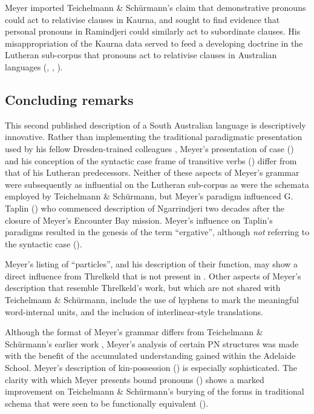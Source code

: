 Meyer imported Teichelmann \& Schürmann’s claim that demonstrative pronouns could act to relativise clauses in Kaurna, and sought to find evidence that personal pronouns in Ramindjeri could similarly act to subordinate clauses. His misappropriation of the Kaurna data served to feed a developing doctrine in the Lutheran sub-corpus that pronouns act to relativise clauses in Australian languages (, , ).

\subsection{Concluding remarks}
\label{sec:key:6.1.3}

This second published description of a South Australian language is descriptively innovative. Rather than implementing the traditional paradigmatic presentation used by his fellow Dresden-trained colleagues \citet{teichelmann_outlines_1840}, Meyer’s presentation of case () and his conception of the syntactic case frame of transitive verbs () differ from that of his Lutheran predecessors. Neither of these aspects of Meyer’s grammar were subsequently as influential on the Lutheran sub-corpus as were the schemata employed by Teichelmann \& Schürmann, but Meyer’s paradigm influenced G. Taplin () who commenced description of Ngarrindjeri two decades after the closure of Meyer’s Encounter Bay mission. Meyer’s influence on Taplin’s paradigms resulted in the genesis of the term ``ergative'', although \textit{not} referring to the syntactic case ().

Meyer’s listing of ``particles'', and his description of their function, may show a direct influence from Threlkeld that is not present in \citet{teichelmann_outlines_1840}. Other aspects of Meyer’s description that resemble Threlkeld’s work, but which are not shared with Teichelmann \& Schürmann, include the use of hyphens to mark the meaningful word-internal units, and the inclusion of interlinear-style translations.

Although the format of Meyer’s grammar differs from Teichelmann \& Schürmann’s earlier work \citeyearpar{teichelmann_outlines_1840}, Meyer’s analysis of certain PN structures was made with the benefit of the accumulated understanding gained within the Adelaide School. Meyer’s description of kin-possession () is especially sophisticated. The clarity with which Meyer presents bound pronouns () shows a marked improvement on Teichelmann \& Schürmann’s burying of the forms in traditional schema that were seen to be functionally equivalent ().

